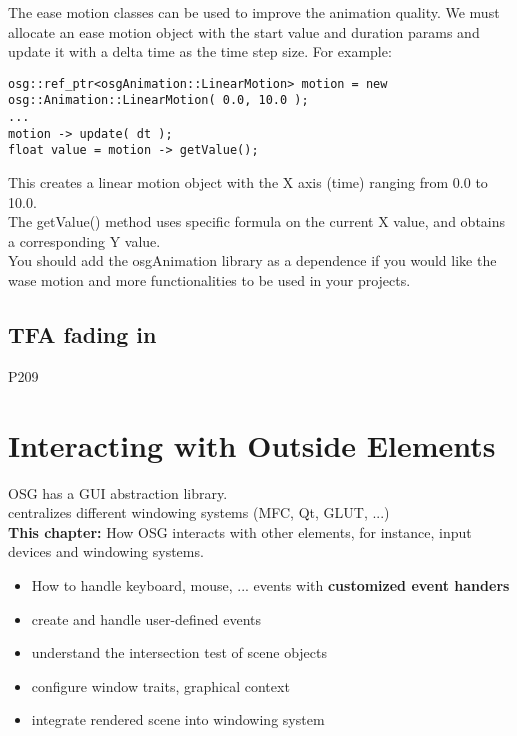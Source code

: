 \documentclass[a4paper,12pt]{book}
\begin{document}
The ease motion classes can be used to improve the animation quality. We must allocate an ease motion object with the start value and duration params and update it with a delta time as the time step size. For example:

\begin{lstlisting}
osg::ref_ptr<osgAnimation::LinearMotion> motion = new osg::Animation::LinearMotion( 0.0, 10.0 );
...
motion -> update( dt );
float value = motion -> getValue();
\end{lstlisting}

This creates a linear motion object with the X axis (time) ranging from 0.0 to 10.0. \\
The getValue() method uses specific formula on the current X value, and obtains a corresponding Y value.\\

You should add the osgAnimation library as a dependence if you would like the wase motion and more functionalities to be used in your projects.

\section{TFA fading in}
P209

\chapter{Interacting with Outside Elements}

OSG has a GUI abstraction library.\\
\textrightarrow centralizes different windowing systems (MFC, Qt, GLUT, ...)\\
\textbf{This chapter:} How OSG interacts with other elements, for instance, input devices and windowing systems.

\begin{itemize}
\item How to handle keyboard, mouse, ... events with \textbf{customized event handers}
\item create and handle user-defined events
\item understand the intersection test of scene objects
\item configure window traits, graphical context
\item integrate rendered scene into windowing system
\end{itemize}
\end{document}
